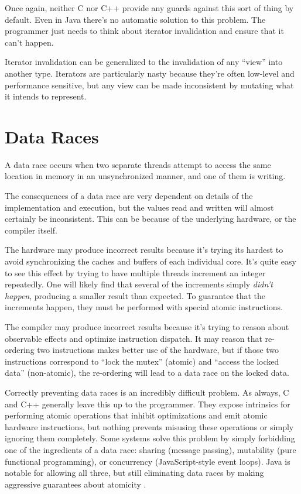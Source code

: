 Once again, neither C nor C++ provide any guards against this sort of thing
by default. Even in Java there's no automatic solution to this problem. The
programmer just needs to think about iterator invalidation and ensure that it
can't happen.

Iterator invalidation can be generalized to the invalidation of any ``view''
into another type. Iterators are particularly nasty because they're often
low-level and performance sensitive, but any view can be made
inconsistent by mutating what it intends to represent.






\section{Data Races}

A data race occurs when two separate threads attempt to access the same location
in memory in an unsynchronized manner, and one of them is writing.

The consequences of a data race are very dependent on details of the implementation
and execution, but the values read and written will almost certainly be inconsistent.
This can be because of the underlying hardware, or the compiler itself.

The hardware may produce incorrect results because it's trying its hardest to avoid
synchronizing the caches and buffers of each individual core. It's quite easy to
see this effect by trying to have multiple threads increment an integer repeatedly.
One will likely find that several of the increments simply \emph{didn't happen},
producing a smaller result than expected. To guarantee that the increments happen,
they must be performed with special atomic instructions.

The compiler may produce incorrect results because it's trying to reason about
observable effects and optimize instruction dispatch. It may reason that re-ordering
two instructions makes better use of the hardware, but if those two instructions
correspond to ``lock the mutex'' (atomic) and ``access the locked data'' (non-atomic),
the re-ordering will lead to a data race on the locked data.

Correctly preventing data races is an incredibly difficult problem. As always,
C and C++ generally leave this up to the programmer. They expose intrinsics for
performing atomic operations that inhibit optimizations and emit atomic hardware
instructions, but nothing prevents misusing these operations or simply ignoring
them completely. Some systems solve this problem by simply forbidding one
of the ingredients of a data race: sharing (message passing), mutability
(pure functional programming), or concurrency (JavaScript-style event loops).
Java is notable for allowing all three, but still eliminating data races by
making aggressive guarantees about atomicity \cite{aspinall2007formalising}.

